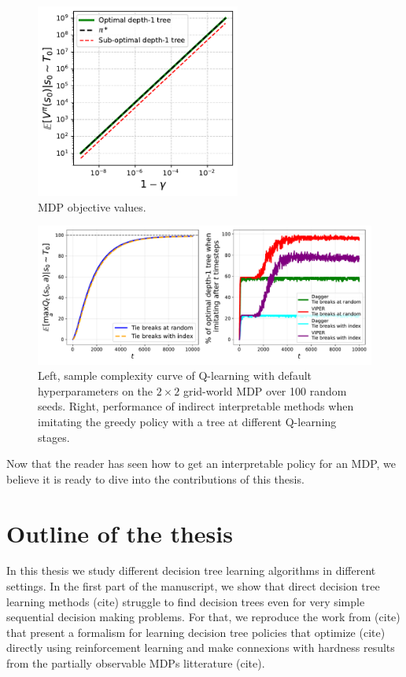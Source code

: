 \begin{figure}
    \centering
    \includegraphics[width=0.6\textwidth]{images/images_part1/policy_values_comparison.pdf}
    \caption{MDP objective values.}\label{fig:objectives}
\end{figure}

\begin{figure}
    \centering
    \includegraphics[width=1\textwidth]{images/images_part1/base_mdp.pdf}
    \caption{Left, sample complexity curve of Q-learning with default hyperparameters on the $2\times 2$ grid-world MDP over 100 random seeds. Right, performance of indirect interpretable methods when imitating the greedy policy with a tree at different Q-learning stages. }
\end{figure}


Now that the reader has seen how to get an interpretable policy for an MDP, we believe it is ready to dive into the contributions of this thesis.

\section{Outline of the thesis}

In this thesis we study different decision tree learning algorithms in different settings. 
In the first part of the manuscript, we show that direct decision tree learning methods (cite) struggle to find decision trees even for very simple sequential decision making problems.
For that, we reproduce the work from (cite) that present a formalism for learning decision tree policies that optimize (cite) directly using reinforcement learning and make connexions with hardness results from the partially observable MDPs litterature (cite).

